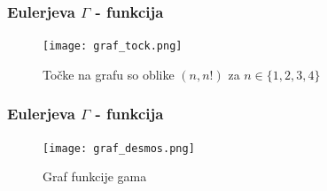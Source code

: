 \documentclass{beamer}
\theoremstyle{plain}
\begin{document}
\begin{frame}
\frametitle{Eulerjeva $\Gamma$ - funkcija}
\begin{figure}
\texttt{[image: graf\_tock.png]}
\caption{Točke na grafu so oblike $(n,n!)$ za $n \in \{1,2,3,4\}$}
\end{figure}
\end{frame}

\begin{frame}
\frametitle{Eulerjeva $\Gamma$ - funkcija}
\begin{figure}
\texttt{[image: graf\_desmos.png]}
\caption{Graf funkcije gama}
\end{figure}
\end{frame}

\end{document}
